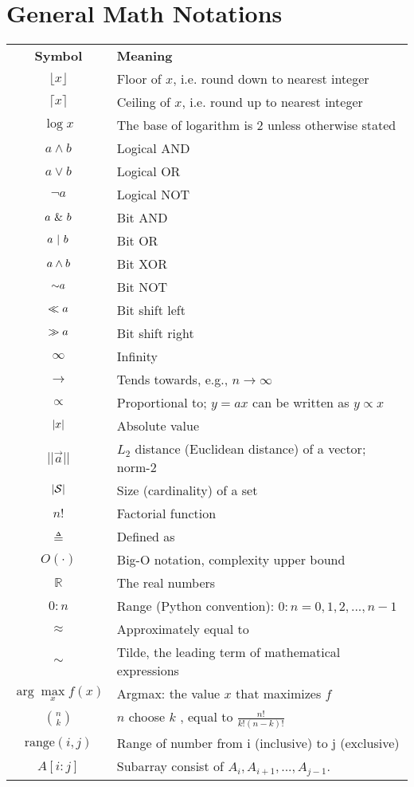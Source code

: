 \label{sec:Notation}

\section*{General Math Notations}

\begin{longtable}{cl}
\hline\noalign{\smallskip}
\textbf{Symbol} & \textbf{Meaning} \\
\noalign{\smallskip}\hline\noalign{\smallskip}
$\lfloor x \rfloor$ & Floor of $x$, i.e. round down to nearest integer\\
$\lceil x \rceil$ & Ceiling of $x$, i.e. round up to nearest integer\\
$\log x$ & The base of logarithm is 2 unless otherwise stated\\
$a \wedge b$ & Logical AND\\
$a \vee b$ & Logical OR\\
$\neg a $ & Logical NOT\\
$a\ \&\  b$ & Bit AND\\
$a \ |\  b$ & Bit OR\\
$a \wedge  b$ & Bit XOR\\
$\mathord{\sim} a$ & Bit NOT\\
$\ll a$ & Bit shift left\\
$\gg a$ & Bit shift right\\
$\infty$ & Infinity\\
$\rightarrow$ & Tends towards, e.g., $n \rightarrow \infty$\\
$\propto$ &Proportional to; $y = ax$ can be written as $y \propto x$\\
$\left\lvert x\right\rvert$ & Absolute value\\
$||\vec{a}||$ & $L_2$ distance (Euclidean distance) of a vector; norm-2 \\
$\left\lvert\mathcal{S}\right\rvert$ & Size (cardinality) of a set\\
$n!$ & Factorial function\\
$\triangleq$ & Defined as\\
$O(\cdot)$ & Big-O notation, complexity upper bound\\
$\mathbb{R}$ & The real numbers\\
$0:n$ & Range (Python convention): $0:n = {0, 1, 2,...,n-1}$\\
$\approx$ & Approximately equal to\\
$\sim$ & Tilde, the leading term of mathematical expressions \\
$\arg\max\limits_x f(x)$ & Argmax: the value $x$ that maximizes $f$\\
$\binom{n}{k}$ & $n$ choose $k$ , equal to $\frac{n!}{k!(n-k)!}$\\
$\text{range}(i,j)$ & Range of number from i (inclusive) to j (exclusive) \\
$A[i:j]$ & Subarray consist of $A_i, A_{i+1}, ..., A_{j-1}$.
\noalign{\smallskip}\hline\noalign{\smallskip}
\end{longtable}


\twocolumn
